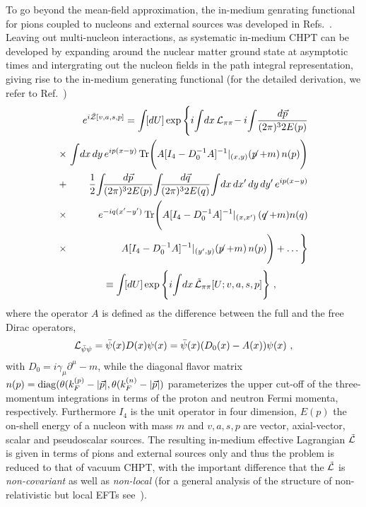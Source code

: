 \documentclass[aps,rmp,nofootinbib,twocolumn,floatfix]{revtex4}
\newcommand{\beq}{\begin{equation}}
\newcommand{\eeq}{\end{equation}}
\newcommand{\beqa}{\begin{eqnarray}}
\newcommand{\eeqa}{\end{eqnarray}}
\newcommand{\barr}[1]{\not\mathrel #1}
\begin{document}
To go beyond the mean-field approximation, the in-medium
genrating functional for pions coupled to nucleons and
external sources was developed in  Refs.~\cite{Oller:2001sn,Meissner:2001gz}.
Leaving out multi-nucleon interactions, as systematic
in-medium CHPT can be developed by expanding  around the
nuclear matter ground state at asymptotic times and
intergrating out the nucleon fields in the path integral
representation, giving rise to the in-medium generating
functional (for the detailed derivation, we refer
to Ref.~\cite{Oller:2001sn})
\beqa
&& e^{i \tilde{{\cal Z}}[v,a,s,p]} = \int\! 
 [dU] \exp\Bigg\{i\!\int\! dx\, {\cal L}_{\pi\pi}\!
- i
\!\int\!\frac{d\vec{p}}{(2\pi)^3 2 E(p)}\nonumber\\ 
&\times& \!\!\!\!\int\! dx\,dy\, e^{ip(x-y)}\,
\hbox{Tr}\Bigg( A[I_4-D_0^{-1}A]^{-1}
\arrowvert_{(x,y)}
(\barr{p+m})\,n(p)\Bigg)
\nonumber \\ 
&+&\frac{1}{2}\!\int\!\!\! \frac{d\vec{p}}{(2\pi)^3 2E(p)}\!\int\! \!\! 
\frac{d\vec{q}}{(2\pi)^3 2 E(q)}
\!\int\! dx\,dx'\,dy\,dy'\,e^{ip(x-y)}\nonumber\\
&\times& \!\!\!e^{-iq(x'-y')}\, \hbox{Tr}\Bigg(
 A[I_4-D_0^{-1}A]^{-1}\arrowvert_{(x,x')}\, (\barr{q}+m)
n(q) \nonumber\\ 
&\times& \!\!\!A[I_4-D_0^{-1}A]^{-1}
\arrowvert_{(y',y)}(\barr{p}+m)\,n(p)\Bigg)+ \ldots\Bigg\}
\nonumber
\eeqa
\beqa
&& \,\,\, \equiv  \int\! 
 [dU] \exp\Bigg\{i\!\int\! dx\, {\tilde 
{\cal L}}_{\pi\pi}[U;v,a,s,p]\Bigg\}~,
\label{eq:fZ2}
\eeqa
where the operator $A$ is defined as the difference between the full
and the free Dirac operators, 
\beq
{\cal L}_{\bar\psi \psi} = \bar{\psi}(x) D(x) \psi(x) 
=  \bar{\psi}(x) (D_0(x)  -A(x)) \psi (x)~,
\eeq
with  $D_0 = i \gamma_\mu\partial^\mu -m$, while the diagonal 
flavor matrix $n(p)  = {\rm diag}(\theta(k_F^{(p)} - |\vec{p}|,
\theta(k_F^{(n)} - |\vec{p}|)$ parameterizes the upper cut-off 
of the three-momentum integrations in terms of the proton and neutron
Fermi momenta, respectively. Furthermore $I_4$ is the unit operator
in four dimension, $E(p)$ the on-shell energy of a nucleon with
mass $m$ and $v,a,s,p$ are vector, axial-vector, scalar and
pseudoscalar sources. The resulting in-medium effective 
Lagrangian $\tilde{\cal L}$
is given in terms of pions and external sources only and thus the
problem is reduced to that of vacuum CHPT, with the important
difference that the  $\tilde{\cal L}$ is {\sl non-covariant} as well
as {\sl non-local} (for a general analysis of the structure of
non-relativistic but local EFTs see~\cite{Leutwyler:1993gf}). 
\end{document}
